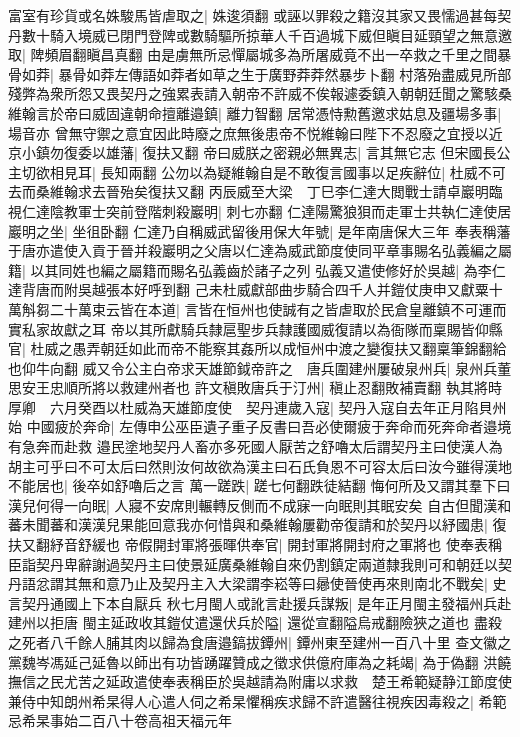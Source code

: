 富室有珍貨或名姝駿馬皆虐取之|{
	姝逡須翻}
或誣以罪殺之籍沒其家又畏懦過甚每契丹數十騎入境威已閉門登陴或數騎驅所掠華人千百過城下威但瞋目延頸望之無意邀取|{
	陴頻眉翻瞋昌真翻}
由是虜無所忌憚屬城多為所屠威竟不出一卒救之千里之間暴骨如莽|{
	暴骨如莽左傳語如莽者如草之生于廣野莽莽然暴步卜翻}
村落殆盡威見所部殘弊為衆所怨又畏契丹之強累表請入朝帝不許威不俟報遽委鎮入朝朝廷聞之驚駭桑維翰言於帝曰威固違朝命擅離邉鎮|{
	離力智翻}
居常憑恃勲舊邀求姑息及疆場多事|{
	場音亦}
曾無守禦之意宜因此時廢之庶無後患帝不悦維翰曰陛下不忍廢之宜授以近京小鎮勿復委以雄藩|{
	復扶又翻}
帝曰威朕之密親必無異志|{
	言其無它志}
但宋國長公主切欲相見耳|{
	長知兩翻}
公勿以為疑維翰自是不敢復言國事以足疾辭位|{
	杜威不可去而桑維翰求去晉殆矣復扶又翻}
丙辰威至大梁　丁巳李仁達大閲戰士請卓巖明臨視仁達陰教軍士突前登階刺殺巖明|{
	刺七亦翻}
仁達陽驚狼狽而走軍士共執仁達使居巖明之坐|{
	坐徂卧翻}
仁達乃自稱威武留後用保大年號|{
	是年南唐保大三年}
奉表稱藩于唐亦遣使入貢于晉并殺巖明之父唐以仁達為威武節度使同平章事賜名弘義編之屬籍|{
	以其同姓也編之屬籍而賜名弘義齒於諸子之列}
弘義又遣使修好於吳越|{
	為李仁達背唐而附吳越張本好呼到翻}
己未杜威獻部曲步騎合四千人并鎧仗庚申又獻粟十萬斛芻二十萬束云皆在本道|{
	言皆在恒州也使誠有之皆虐取於民倉皇離鎮不可運而實私家故獻之耳}
帝以其所獻騎兵隸扈聖步兵隸護國威復請以為衙隊而稟賜皆仰縣官|{
	杜威之愚弄朝廷如此而帝不能察其姦所以成恒州中渡之變復扶又翻稟筆錦翻給也仰牛向翻}
威又令公主白帝求天雄節鉞帝許之　唐兵圍建州屢破泉州兵|{
	泉州兵董思安王忠順所將以救建州者也}
許文稹敗唐兵于汀州|{
	稹止忍翻敗補賣翻}
執其將時厚卿　六月癸酉以杜威為天雄節度使　契丹連歲入寇|{
	契丹入寇自去年正月陷貝州始}
中國疲於奔命|{
	左傳申公巫臣遺子重子反書曰吾必使爾疲于奔命而死奔命者邉境有急奔而赴救}
邉民塗地契丹人畜亦多死國人厭苦之舒嚕太后謂契丹主曰使漢人為胡主可乎曰不可太后曰然則汝何故欲為漢主曰石氏負恩不可容太后曰汝今雖得漢地不能居也|{
	後卒如舒嚕后之言}
萬一蹉跌|{
	蹉七何翻跌徒結翻}
悔何所及又謂其羣下曰漢兒何得一向眠|{
	人寢不安席則輾轉反側而不成寐一向眠則其眠安矣}
自古但聞漢和蕃未聞蕃和漢漢兒果能回意我亦何惜與和桑維翰屢勸帝復請和於契丹以紓國患|{
	復扶又翻紓音舒緩也}
帝假開封軍將張暉供奉官|{
	開封軍將開封府之軍將也}
使奉表稱臣詣契丹卑辭謝過契丹主曰使景延廣桑維翰自來仍割鎮定兩道隸我則可和朝廷以契丹語忿謂其無和意乃止及契丹主入大梁謂李崧等曰曏使晉使再來則南北不戰矣|{
	史言契丹通國上下本自厭兵}
秋七月閩人或訛言赴援兵謀叛|{
	是年正月閩主發福州兵赴建州以拒唐}
閩主延政收其鎧仗遣還伏兵於隘|{
	還從宣翻隘烏戒翻險狹之道也}
盡殺之死者八千餘人脯其肉以歸為食唐邉鎬拔鐔州|{
	鐔州東至建州一百八十里}
查文徽之黨魏岑馮延己延魯以師出有功皆踴躍贊成之徵求供億府庫為之耗竭|{
	為于偽翻}
洪饒撫信之民尤苦之延政遣使奉表稱臣於吳越請為附庸以求救　楚王希範疑静江節度使兼侍中知朗州希杲得人心遣人伺之希杲懼稱疾求歸不許遣醫往視疾因毒殺之|{
	希範忌希杲事始二百八十卷高祖天福元年}



